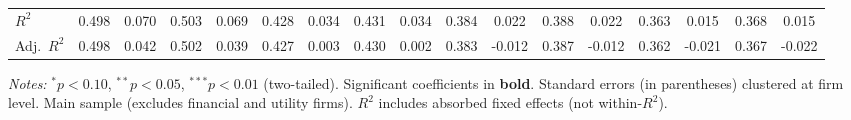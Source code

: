 \documentclass[11pt,a4paper]{article}
\begin{document}
\begin{table}[htbp]
\begin{tabular}{lcccccccccccccccc}
$R^2$ & 0.498 & 0.070 & 0.503 & 0.069 & 0.428 & 0.034 & 0.431 & 0.034 & 0.384 & 0.022 & 0.388 & 0.022 & 0.363 & 0.015 & 0.368 & 0.015 \\
Adj.~$R^2$ & 0.498 & 0.042 & 0.502 & 0.039 & 0.427 & 0.003 & 0.430 & 0.002 & 0.383 & -0.012 & 0.387 & -0.012 & 0.362 & -0.021 & 0.367 & -0.022 \\
\bottomrule
\end{tabular}
\begin{minipage}{\linewidth}
\vspace{2pt}\scriptsize
\textit{Notes:} $^{*}p<0.10$, $^{**}p<0.05$, $^{***}p<0.01$ (two-tailed).
 Significant coefficients in \textbf{bold}.
 Standard errors (in parentheses) clustered at firm level.
 Main sample (excludes financial and utility firms).
 $R^2$ includes absorbed fixed effects (not within-$R^2$).
\end{minipage}
\end{table}
\clearpage
\end{document}
